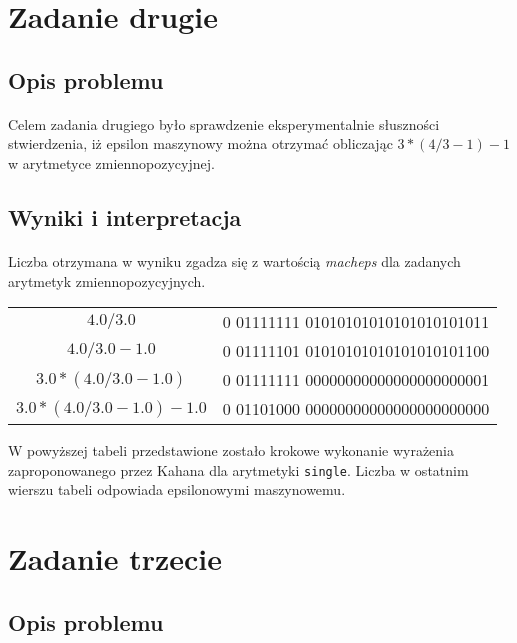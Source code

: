 \documentclass[a4paper]{article}
\begin{document}
\section{Zadanie drugie}

\subsection{Opis problemu}
\paragraph{}
Celem zadania drugiego było sprawdzenie eksperymentalnie słuszności stwierdzenia, iż epsilon maszynowy można otrzymać obliczając $3 * (4/3 - 1) -1$ w arytmetyce zmiennopozycyjnej.

\subsection{Wyniki i interpretacja}
\paragraph{}
Liczba otrzymana w wyniku zgadza się z wartością \textit{macheps} dla zadanych arytmetyk zmiennopozycyjnych. 

\begin{center}
\begin{tabular}{ |c|c| } 
 \hline
 $4.0 / 3.0$ & 0 01111111 01010101010101010101011 \\ 
 $4.0 / 3.0 - 1.0$ & 0 01111101 01010101010101010101100 \\ 
 $3.0 * (4.0 / 3.0 - 1.0)$ & 0 01111111 00000000000000000000001 \\
 $3.0 * (4.0 / 3.0 - 1.0) - 1.0$ & 0 01101000 00000000000000000000000 \\ 
 \hline
\end{tabular}
\end{center}

W powyższej tabeli przedstawione zostało krokowe wykonanie wyrażenia zaproponowanego przez Kahana dla arytmetyki \texttt{single}. Liczba w ostatnim wierszu tabeli odpowiada epsilonowymi maszynowemu.

\section{Zadanie trzecie}

\subsection{Opis problemu}
\end{document}
